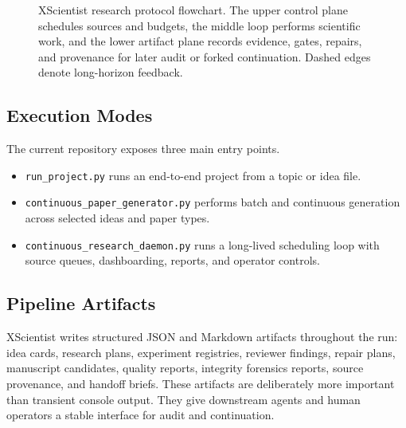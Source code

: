\documentclass[11pt]{article}
\begin{document}
\begin{figure}[t]
\caption{XScientist research protocol flowchart. The upper control plane
schedules sources and budgets, the middle loop performs scientific work, and
the lower artifact plane records evidence, gates, repairs, and provenance for
later audit or forked continuation. Dashed edges denote long-horizon feedback.}
\label{fig:pipeline}
\end{figure}

\subsection{Execution Modes}

The current repository exposes three main entry points.
\begin{itemize}[leftmargin=*]
  \item \texttt{run\_project.py} runs an end-to-end project from a topic or
  idea file.
  \item \texttt{continuous\_paper\_generator.py} performs batch and continuous
  generation across selected ideas and paper types.
  \item \texttt{continuous\_research\_daemon.py} runs a long-lived scheduling
  loop with source queues, dashboarding, reports, and operator controls.
\end{itemize}

\subsection{Pipeline Artifacts}

XScientist writes structured JSON and Markdown artifacts throughout the run:
idea cards, research plans, experiment registries, reviewer findings, repair
plans, manuscript candidates, quality reports, integrity forensics reports,
source provenance, and handoff briefs. These artifacts are deliberately more
important than transient console output. They give downstream agents and
human operators a stable interface for audit and continuation.
\end{document}

